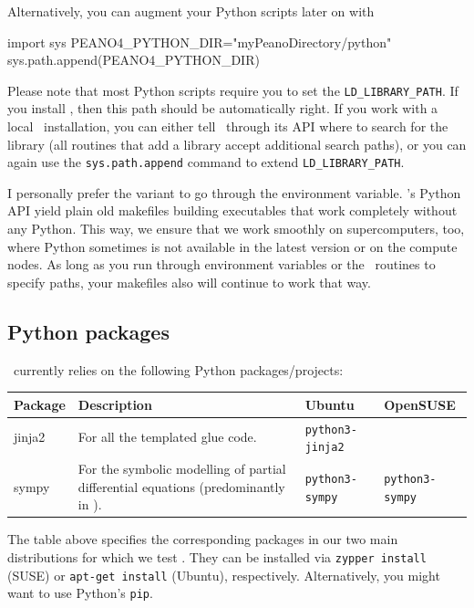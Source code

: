 Alternatively, you can augment your Python scripts later on with 
\begin{code}
import sys
PEANO4_PYTHON_DIR="myPeanoDirectory/python"
sys.path.append(PEANO4_PYTHON_DIR)
\end{code}


\noindent
Please note that most Python scripts require you to set the
\texttt{LD\_LIBRARY\_PATH}. 
If you install \Peano, then this path should be automatically right.
If you work with a local \Peano\ installation, you can either tell \Peano\
through its API where to search for the library (all routines that add a
library accept additional search paths), or you can again use the
\texttt{sys.path.append} command to extend \texttt{LD\_LIBRARY\_PATH}.


\begin{remark}
 I personally prefer the variant to go through the environment variable.
 \Peano's Python API yield plain old makefiles building executables that work
 completely without any Python. 
 This way, we ensure that we work smoothly on supercomputers, too, where Python
 sometimes is not available in the latest version or on the compute nodes.
 As long as you run through environment variables or the \Peano\ routines to
 specify paths, your makefiles also will continue to work that way. 
\end{remark}


\subsection{Python packages}

\Peano\ currently relies on the following Python packages/projects:


\begin{center}
 \begin{tabular}{lp{6cm}ll}\\
   Package & Description & Ubuntu & OpenSUSE \\
   \hline
   jinja2 & For all the templated glue code. & 
    \texttt{python3-jinja2} &
    \texttt{} 
    \\
   sympy & For the symbolic modelling of partial differential equations
    (predominantly in \ExaHyPE). &
    \texttt{python3-sympy} &
    \texttt{python3-sympy} 
 \end{tabular}
\end{center}


\noindent
The table above specifies the corresponding packages in our two main
distributions for which we test \Peano. 
They can be installed via \texttt{zypper install} (SUSE) or \texttt{apt-get
install} (Ubuntu), respectively.
Alternatively, you might want to use Python's \texttt{pip}.





